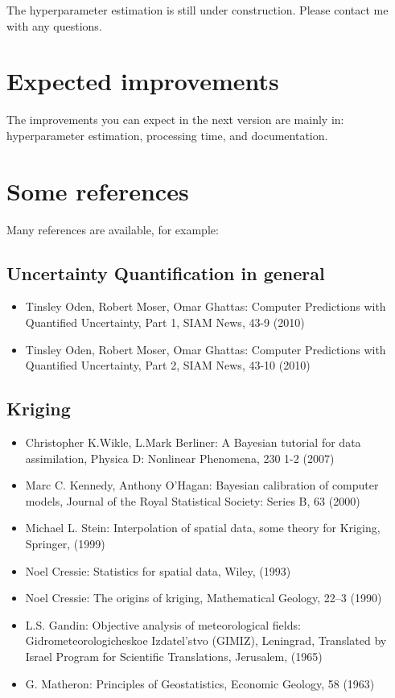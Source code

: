 \documentclass[a4paper,10pt]{article}
\begin{document}
The hyperparameter estimation is still under construction. Please contact me with any questions.

\section{Expected improvements}
The improvements you can expect in the next version are mainly in: hyperparameter estimation, processing time, and documentation.

\section{Some references}
Many references are available, for example:

\subsection{Uncertainty Quantification in general}
\begin{itemize}
\item Tinsley Oden, Robert Moser, Omar Ghattas: Computer Predictions with Quantified Uncertainty, Part 1, SIAM News, 43-9 (2010)
\item Tinsley Oden, Robert Moser, Omar Ghattas: Computer Predictions with Quantified Uncertainty, Part 2, SIAM News, 43-10 (2010)
\end{itemize}

\subsection{Kriging}
\begin{itemize}
\item Christopher K.Wikle, L.Mark Berliner: A Bayesian tutorial for data assimilation, Physica D: Nonlinear Phenomena, 230 1-2 (2007)
\item Marc C. Kennedy, Anthony O’Hagan: Bayesian calibration of computer models, Journal of the Royal Statistical Society: Series B, 63 (2000)
\item Michael L. Stein: Interpolation of spatial data, some theory for Kriging, Springer, (1999)
\item Noel Cressie: Statistics for spatial data, Wiley, (1993)
\item Noel Cressie: The origins of kriging, Mathematical Geology, 22–3 (1990)
\item L.S. Gandin: Objective analysis of meteorological fields: Gidrometeorologicheskoe Izdatel’stvo (GIMIZ), Leningrad, Translated by Israel Program for Scientific Translations, Jerusalem, (1965)
\item G. Matheron: Principles of Geostatistics, Economic Geology, 58 (1963)
\end{itemize}
\end{document}
